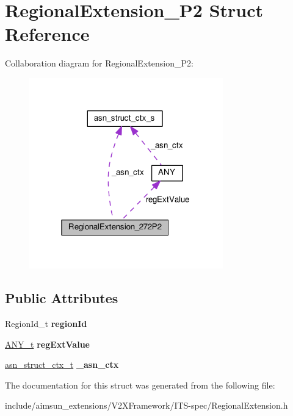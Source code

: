 \hypertarget{structRegionalExtension__272P2}{}\section{Regional\+Extension\+\_\+P2 Struct Reference}
\label{structRegionalExtension__272P2}


Collaboration diagram for Regional\+Extension\+\_\+P2\+:\nopagebreak
\begin{figure}[H]
\begin{center}
\leavevmode
\includegraphics[width=238pt]{structRegionalExtension__272P2__coll__graph}
\end{center}
\end{figure}
\subsection*{Public Attributes}
\begin{DoxyCompactItemize}
\item 
Region\+Id\+\_\+t {\bfseries region\+Id}\hypertarget{structRegionalExtension__272P2_a195d4a19472b75fdb5510c25b992f853}{}\label{structRegionalExtension__272P2_a195d4a19472b75fdb5510c25b992f853}

\item 
\hyperlink{structANY}{A\+N\+Y\+\_\+t} {\bfseries reg\+Ext\+Value}\hypertarget{structRegionalExtension__272P2_a975d6f1f645c29bb52b9cf859d670bb3}{}\label{structRegionalExtension__272P2_a975d6f1f645c29bb52b9cf859d670bb3}

\item 
\hyperlink{structasn__struct__ctx__s}{asn\+\_\+struct\+\_\+ctx\+\_\+t} {\bfseries \+\_\+asn\+\_\+ctx}\hypertarget{structRegionalExtension__272P2_a2940bb5a7b9ca47d5a4074879a2267d6}{}\label{structRegionalExtension__272P2_a2940bb5a7b9ca47d5a4074879a2267d6}

\end{DoxyCompactItemize}


The documentation for this struct was generated from the following file\+:\begin{DoxyCompactItemize}
\item 
include/aimsun\+\_\+extensions/\+V2\+X\+Framework/\+I\+T\+S-\/spec/Regional\+Extension.\+h\end{DoxyCompactItemize}
